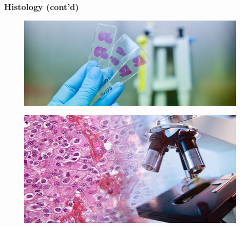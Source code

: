 \documentclass[usenames,dvipsnames]{beamer}
\begin{document}
\begin{frame}
  \frametitle{Histology (cont'd)}
  \begin{figure}[ht]
    \centering
    \includegraphics[width=1.0\textwidth,height=0.3\textheight]{figures/slide.jpg}
    \caption*{\label{fig:slide}}
  \end{figure}
  \vspace{-1.4cm}
  \begin{figure}[ht]
    \centering
    \includegraphics[width=1.0\textwidth,height=0.45\textheight]{figures/slide_microscope.jpg}
    \caption*{\label{fig:slide}}
  \end{figure}
\end{frame}
\end{document}
